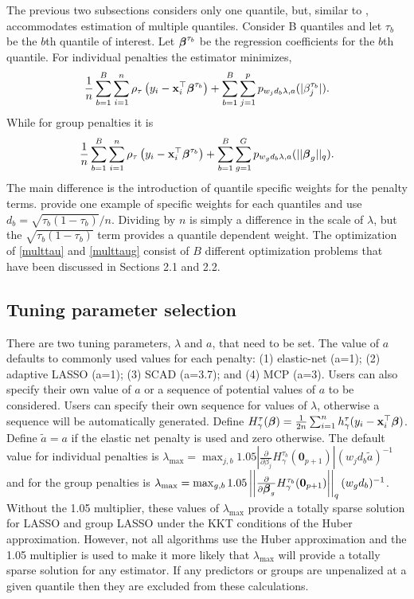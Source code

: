 \documentclass[article]{rqPenVignette}%
\newcommand{\vx}{{\bf x}}
\newcommand{\vbeta}{\mbox{\boldmath $\beta$}}
\begin{document}
The previous two subsections considers only one quantile, but, similar to ,  accommodates estimation of multiple quantiles. Consider B quantiles and let $\tau_b$ be the $b$th quantile of interest. Let $\vbeta^{\tau_b}$ be the regression coefficients for the $b$th quantile.  For individual penalties the estimator minimizes,
\begin{equation}
\label{multtau}
\frac{1}{n} \sum_{b=1}^B\sum_{i=1}^n \rho_\tau\left(y_i - \vx_i^\top\vbeta^{\tau_b}\right) + \sum_{b=1}^B\sum_{j=1}^p p_{w_jd_b\lambda,a}(|\beta^{\tau_b}_j|).
\end{equation}
While for group penalties it is
\begin{equation}
\label{multtaug}
\frac{1}{n} \sum_{b=1}^B \sum_{i=1}^n \rho_\tau\left(y_i - \vx_i^\top\vbeta^{\tau_b}\right) + \sum_{b=1}^B \sum_{g=1}^G p_{w_gd_b\lambda,a}(||\vbeta_g||_q).
\end{equation}
The main difference is the introduction of quantile specific weights for the penalty terms. \citet{qr_lasso} provide one example of specific weights for each quantiles and use $d_b = \sqrt{\tau_b(1-\tau_b)}/n$. Dividing by $n$ is simply a difference in the scale of $\lambda$, but the $\sqrt{\tau_b(1-\tau_b)}$ term provides a quantile dependent weight. The optimization of \eqref{multtau} and \eqref{multtaug} consist of $B$ different optimization problems that have been discussed in Sections 2.1 and 2.2. 

\subsection{Tuning parameter selection}
There are two tuning parameters, $\lambda$ and $a$, that need to be set. The value of $a$ defaults to commonly used values for each penalty: (1) elastic-net (a=1); (2) adaptive LASSO (a=1); (3) SCAD (a=3.7); and (4) MCP (a=3). Users can also specify their own value of $a$ or a sequence of potential values of $a$ to be considered. Users can specify their own sequence for values of $\lambda$, otherwise a sequence will be automatically generated. Define $H_\gamma^\tau(\vbeta) = \frac{1}{2n} \sum_{i=1}^n h_\gamma^\tau(y_i - \vx_i^\top\vbeta)$. Define $\tilde{a}=a$ if the elastic net penalty is used and zero otherwise. The default value for individual penalties is $\lambda_{\max} = \max_{j,b} 1.05\left|\frac{\partial}{\partial \beta_j} H_\gamma^{\tau_b}(\mathbf{0}_{p+1})\right|(w_jd_b\tilde{a})^{-1}$ and for the group penalties is $\lambda_{\max} = \max_{g,b} 1.05\left|\left| \frac{\partial}{\partial \vbeta_g} H_\gamma^{\tau_b}(\mathbf{0}_{p+1})\right|\right|_q (w_gd_b)^{-1}$. Without the 1.05 multiplier, these values of $\lambda_{\max}$ provide a totally sparse solution for LASSO and group LASSO under the KKT conditions of the Huber approximation. However, not all algorithms use the Huber approximation and the 1.05 multiplier is used to make it more likely that $\lambda_{\max}$ will provide a totally sparse solution for any estimator. If any predictors or groups are unpenalized at a given quantile then they are excluded from these calculations.
\end{document}

